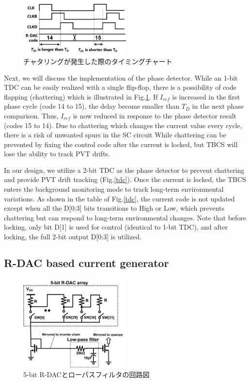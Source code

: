 \documentclass[letterpaper, 10 pt, conference]{ieeeconf}  %
\begin{document}
\begin{figure}[!]
\centering
 \includegraphics[width=0.5\textwidth]{figs/chattering.png}
  \caption{チャタリングが発生した際のタイミングチャート}
\label{chattering}
\end{figure}

Next, we will discuss the implementation of the phase detector. While an 1-bit TDC can be easily realized with a single flip-flop, there is a possibility of code flapping (chattering) which is illustrated in Fig.\ref{chattering}. If $I_{ref}$ is increased in the first phase cycle (code 14 to 15), the delay become smaller than $T_D$ in the next phase comparison. Thus, $I_{ref}$ is now reduced in response to the phase detector result (codes 15 to 14). Due to chattering which changes the current value every cycle, there is a risk of unwanted spurs in the SC circuit  While chattering can be prevented by fixing the control code after the current is locked, but TBCS will lose the ability to track PVT drifts.

In our design, we utilize a 2-bit TDC as the phase detector to prevent chattering and  provide PVT drift tracking (Fig.\ref{tdc}).
Once the current is locked, the TBCS enters the background monitoring mode to track long-term environmental variations.  As shown in the table of Fig.\ref{tdc}, the current code is not updated except when all the D[0:3] bits transitions to High or Low, which prevents chattering but can respond to long-term environmental changes. Note that before locking, only bit D[1] is used for control (identical to 1-bit TDC), and after locking, the full 2-bit output D[0:3] is utilized.

\subsection{R-DAC based current generator}
\begin{figure}[!]
\centering
 \includegraphics[width=0.5\textwidth]{figs/rdac.png}
  \caption{5-bit R-DACとローパスフィルタの回路図}
\label{rdac_sche}
\end{figure}
\end{document}
